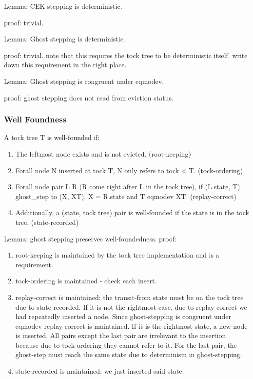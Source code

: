 Lemma: CEK stepping is deterministic.

proof: trivial.

Lemma: Ghost stepping is deterministic.

proof: trivial. note that this requires the tock tree to be deterministic itself. write down this requirement in the right place.

Lemma: Ghost stepping is congruent under eqmodev.

proof: ghost stepping does not read from eviction status.

\subsubsection{Well Foundness}
A tock tree T is well-founded  if:
\begin{enumerate}
    \item The leftmost node exists and is not evicted. (root-keeping)
    \item Forall node N inserted at tock T, N only refers to tock < T. (tock-ordering)
    \item Forall node pair L R (R come right after L in the tock tree), if (L.state, T) ghost\_step to (X, XT), X = R.state and T eqmodev XT. (replay-correct)
    \item Additionally, a (state, tock tree) pair is well-founded if the state is in the tock tree. (state-recorded)
\end{enumerate}

Lemma: ghost stepping preserves well-foundedness.
proof:
\begin{enumerate}
    \item root-keeping is maintained by the tock tree implementation and is a requirement.
    \item tock-ordering is maintained - check each insert.
    \item replay-correct is maintained: the transit-from state must be on the tock tree due to state-recorded. If it is not the rightmost case, due to replay-correct we had repeatedly inserted a node. Since ghost-stepping is congruent under eqmodev replay-correct is maintained. If it is the rightmost state, a new node is inserted. All pairs except the last pair are irrelevant to the insertion because due to tock-ordering they cannot refer to it. For the last pair, the ghost-step must reach the same state due to determinism in ghost-stepping.
    \item state-recorded is maintained: we just inserted said state.
\end{enumerate}

